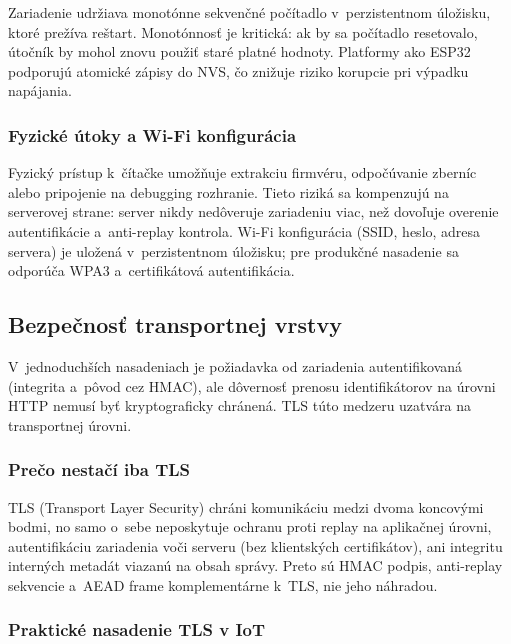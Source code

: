 Zariadenie udržiava monotónne sekvenčné počítadlo v~perzistentnom úložisku, ktoré prežíva reštart. Monotónnosť je kritická: ak by sa počítadlo resetovalo, útočník by mohol znovu použiť staré platné hodnoty\cite{NIST80053}. Platformy ako ESP32 podporujú atomické zápisy do NVS, čo znižuje riziko korupcie pri výpadku napájania\cite{Espressif2024}.

\subsubsection{Fyzické útoky a Wi-Fi konfigurácia}

Fyzický prístup k~čítačke umožňuje extrakciu firmvéru, odpočúvanie zberníc alebo pripojenie na debugging rozhranie\cite{NIST80094}. Tieto riziká sa kompenzujú na serverovej strane: server nikdy nedôveruje zariadeniu viac, než dovoľuje overenie autentifikácie a~anti-replay kontrola\cite{SaltzerSchroeder1975}. Wi-Fi konfigurácia (SSID, heslo, adresa servera) je uložená v~perzistentnom úložisku; pre produkčné nasadenie sa odporúča WPA3 a~certifikátová autentifikácia\cite{RFC8446}.


\subsection{Bezpečnosť transportnej vrstvy}

V~jednoduchších nasadeniach je požiadavka od zariadenia autentifikovaná (integrita a~pôvod cez HMAC), ale dôvernosť prenosu identifikátorov na úrovni HTTP nemusí byť kryptograficky chránená. TLS túto medzeru uzatvára na transportnej úrovni.

\subsubsection{Prečo nestačí iba TLS}

TLS (Transport Layer Security) chráni komunikáciu medzi dvoma koncovými bodmi, no samo o~sebe neposkytuje ochranu proti replay na aplikačnej úrovni, autentifikáciu zariadenia voči serveru (bez klientských certifikátov), ani integritu interných metadát viazanú na obsah správy. Preto sú HMAC podpis, anti-replay sekvencie a~AEAD frame komplementárne k~TLS, nie jeho náhradou\cite{RFC8446,RFC9325}.

\subsubsection{Praktické nasadenie TLS v IoT}

